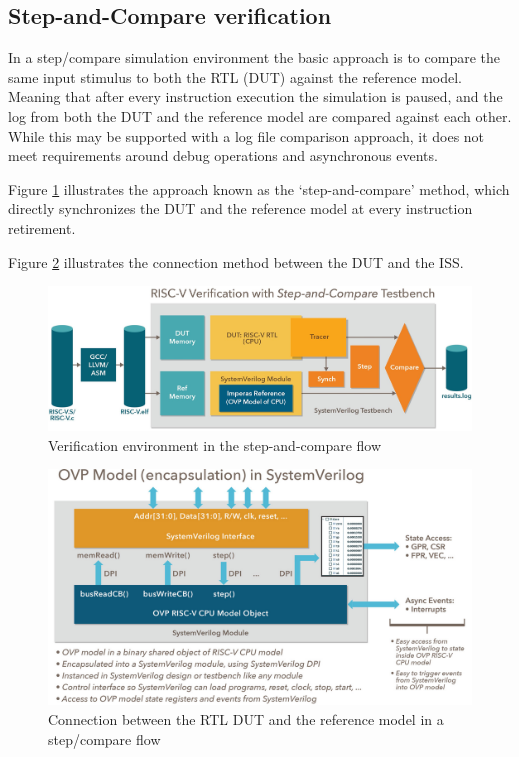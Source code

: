 \documentclass[../main.tex]{subfiles}
\begin{document}
\subsection{Step-and-Compare verification}
In a step/compare simulation environment the basic approach is to compare the same input stimulus to both the RTL (DUT) against the reference model. Meaning that after every instruction execution the simulation is paused, and the log from both the DUT and the reference model are compared against each other. \\
\newline
\noindent While this may be supported with a log file comparison approach, it does not meet requirements around debug operations and asynchronous events. 

\noindent Figure \ref{fig:Stepcompare1} illustrates the approach known as the ‘step-and-compare’ method, which directly synchronizes the DUT and the reference model at every instruction retirement.

\noindent Figure \ref{fig:Stepcompare2} illustrates the connection method between the DUT and the ISS.

\begin{figure}[h!]
\centering
\includegraphics[scale = 0.3]{diagrams/step_compare1.jpg}

\caption{Verification environment in the step-and-compare flow\cite{StepCompare}}
\label{fig:Stepcompare1}
\end{figure}

\begin{figure}[h!]
\centering
\includegraphics[scale = 0.3]{diagrams/step_compare2.jpg}

\caption{Connection between the RTL DUT and the reference model in a step/compare flow\cite{StepCompare}}
\label{fig:Stepcompare2}
\end{figure}
\end{document}
